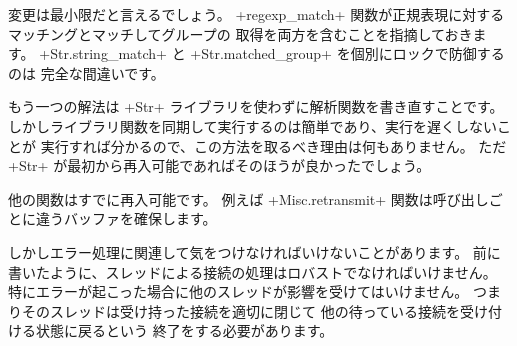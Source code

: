 変更は最小限だと言えるでしょう。
\ml+regexp_match+ 関数が正規表現に対するマッチングとマッチしてグループの
取得を両方を含むことを指摘しておきます。
\ml+Str.string_match+ と \ml+Str.matched_group+ を個別にロックで防御するのは
完全な間違いです。

もう一つの解法は \ml+Str+ ライブラリを使わずに解析関数を書き直すことです。
しかしライブラリ関数を同期して実行するのは簡単であり、実行を遅くしないことが
実行すれば分かるので、この方法を取るべき理由は何もありません。
ただ \ml+Str+ が最初から再入可能であればそのほうが良かったでしょう。

他の関数はすでに再入可能です。
例えば \ml+Misc.retransmit+ 関数は呼び出しごとに違うバッファを確保します。

しかしエラー処理に関連して気をつけなければいけないことがあります。
前に書いたように、スレッドによる接続の処理はロバストでなければいけません。
特にエラーが起こった場合に他のスレッドが影響を受けてはいけません。
つまりそのスレッドは受け持った接続を適切に閉じて
他の待っている接続を受け付ける状態に戻るという  終了をする必要があります。

